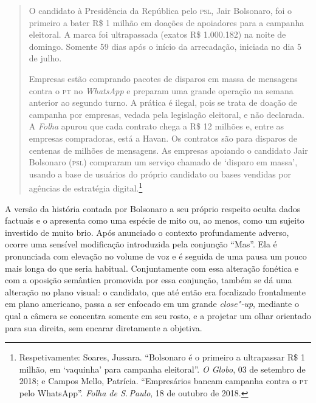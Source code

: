 \begin{quote}
O candidato à Presidência da República pelo \textsc{psl}, Jair
Bolsonaro, foi o primeiro a bater R\$ 1 milhão em doações de
apoiadores para a campanha eleitoral. A marca foi ultrapassada (exatos
R\$ 1.000.182) na noite de domingo. Somente 59 dias após o início da
arrecadação, iniciada no dia 5 de julho.

Empresas estão comprando pacotes de disparos em massa de mensagens
contra o \textsc{pt} no \emph{WhatsApp} e preparam uma grande operação na semana
anterior ao segundo turno. A prática é ilegal, pois se trata de doação
de campanha por empresas, vedada pela legislação eleitoral, e não
declarada. A \emph{Folha} apurou que cada contrato chega a R\$ 12
milhões e, entre as empresas compradoras, está a Havan. Os contratos são
para disparos de centenas de milhões de mensagens. As empresas apoiando
o candidato Jair Bolsonaro (\textsc{psl}) compraram um serviço chamado de
`disparo em massa', usando a base de usuários do próprio candidato ou
bases vendidas por agências de estratégia digital.\footnote{Respetivamente:
  Soares, Jussara. ``Bolsonaro é o primeiro a ultrapassar R\$ 1 milhão,
  em `vaquinha' para campanha eleitoral''. \emph{O Globo}, 03 de
  setembro de 2018; e Campos Mello, Patrícia. ``Empresários bancam campanha contra o \textsc{pt} pelo WhatsApp''. \emph{Folha de S.\,Paulo}, 18 de outubro de 2018.}
\end{quote}

A versão da história contada por Bolsonaro a seu próprio respeito oculta
dados factuais e o apresenta como uma espécie de mito ou, ao menos, como
um sujeito investido de muito brio. Após anunciado o contexto
profundamente adverso, ocorre uma sensível modificação introduzida pela
conjunção ``Mas''. Ela é pronunciada com elevação no volume de voz e é
seguida de uma pausa um pouco mais longa do que seria habitual.
Conjuntamente com essa alteração fonética e com a oposição semântica
promovida por essa conjunção, também se dá uma alteração no plano
visual: o candidato, que até então era focalizado frontalmente em plano
americano, passa a ser enfocado em um grande \emph{close"-up}, mediante o
qual a câmera se concentra somente em seu rosto, e a projetar um olhar
orientado para sua direita, sem encarar diretamente a objetiva.

